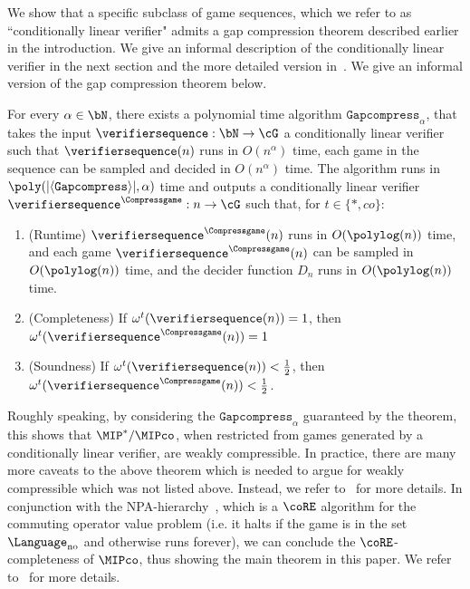 We show that a specific subclass of game sequences, which we refer to as ``conditionally linear verifier" admits a gap compression theorem described earlier in the introduction. We give an informal description of the conditionally linear verifier in the next section and the more detailed version in~. We give an informal version of the gap compression theorem below. 
\begin{theorem} \label{thm:gapcompressioninformal}
	For every $\alpha \in \bN$, there exists a polynomial time algorithm $\mathtt{Gapcompress}_{\alpha}$, that takes the input $\verifiersequence: \bN \rightarrow \cG$ a conditionally linear verifier such that $\verifiersequence(n)$ runs in $O(n^{\alpha})$ time, each game in the sequence can be sampled and decided in $O(n^{\alpha})$ time. The algorithm runs in $\poly(|\langle\mathtt{Gapcompress} \rangle|, \alpha)$ time and outputs a conditionally linear verifier $\verifiersequence^{\Compressgame}: n \rightarrow \cG$ such that, for $t \in \{*, co\}$:
	\begin{enumerate}
		\item (Runtime) $\verifiersequence^{\Compressgame}(n)$ runs in $O(\polylog(n))$ time, and each game $\verifiersequence^{\Compressgame}(n)$ can be sampled in $O(\polylog(n))$ time, and the decider function $D_n$ runs in $O(\polylog(n))$ time.
		\item (Completeness) If $\omega^{t}(\verifiersequence(n)) = 1$, then $\omega^{t}(\verifiersequence^{\Compressgame}(n)) = 1$ 
		\item (Soundness) If $\omega^{t}(\verifiersequence(n)) < \frac{1}{2}$, then $\omega^{t}(\verifiersequence^{\Compressgame}(n)) < \frac{1}{2}$. 
	\end{enumerate}
\end{theorem}
Roughly speaking, by considering the $\mathtt{Gapcompress}_{\alpha}$ guaranteed by the theorem, this shows that $\MIP^*/\MIPco$, when restricted from games generated by a conditionally linear verifier, are weakly compressible. In practice, there are many more caveats to the above theorem which is needed to argue for weakly compressible which was not listed above. Instead, we refer to~ for more details. In conjunction with the NPA-hierarchy~\cite{navascuesConvergentHierarchySemidefinite2008b}, which is a $\coRE$ algorithm for the commuting operator value problem (i.e. it halts if the game is in the set $\Language_{\text{no}}$ and otherwise runs forever), we can conclude the $\coRE$-completeness of $\MIPco$, thus showing the main theorem in this paper. We refer to~ for more details.

